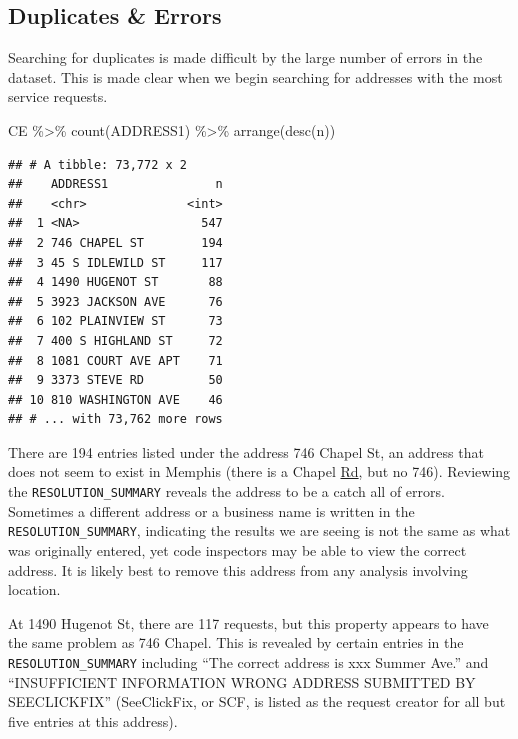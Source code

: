 \documentclass[
]{book}
\newenvironment{Shaded}{\begin{snugshade}}{\end{snugshade}}
\newcommand{\FunctionTok}[1]{\textcolor[rgb]{0.00,0.00,0.00}{#1}}
\newcommand{\NormalTok}[1]{#1}
\newcommand{\SpecialCharTok}[1]{\textcolor[rgb]{0.00,0.00,0.00}{#1}}
\begin{document}
\hypertarget{duplicates-errors}{%
\subsection{Duplicates \& Errors}\label{duplicates-errors}}

Searching for duplicates is made difficult by the large number of errors in the dataset. This is made clear when we begin searching for addresses with the most service requests.

\begin{Shaded}
\begin{Highlighting}[]
\NormalTok{CE }\SpecialCharTok{\%\textgreater{}\%} \FunctionTok{count}\NormalTok{(ADDRESS1) }\SpecialCharTok{\%\textgreater{}\%} \FunctionTok{arrange}\NormalTok{(}\FunctionTok{desc}\NormalTok{(n))}
\end{Highlighting}
\end{Shaded}

\begin{verbatim}
## # A tibble: 73,772 x 2
##    ADDRESS1               n
##    <chr>              <int>
##  1 <NA>                 547
##  2 746 CHAPEL ST        194
##  3 45 S IDLEWILD ST     117
##  4 1490 HUGENOT ST       88
##  5 3923 JACKSON AVE      76
##  6 102 PLAINVIEW ST      73
##  7 400 S HIGHLAND ST     72
##  8 1081 COURT AVE APT    71
##  9 3373 STEVE RD         50
## 10 810 WASHINGTON AVE    46
## # ... with 73,762 more rows
\end{verbatim}

There are 194 entries listed under the address 746 Chapel St, an address that does not seem to exist in Memphis (there is a Chapel \underline{Rd}, but no 746). Reviewing the \texttt{RESOLUTION\_SUMMARY} reveals the address to be a catch all of errors. Sometimes a different address or a business name is written in the \texttt{RESOLUTION\_SUMMARY}, indicating the results we are seeing is not the same as what was originally entered, yet code inspectors may be able to view the correct address. It is likely best to remove this address from any analysis involving location.

At 1490 Hugenot St, there are 117 requests, but this property appears to have the same problem as 746 Chapel. This is revealed by certain entries in the \texttt{RESOLUTION\_SUMMARY} including ``The correct address is xxx Summer Ave.'' and ``INSUFFICIENT INFORMATION WRONG ADDRESS SUBMITTED BY SEECLICKFIX'' (SeeClickFix, or SCF, is listed as the request creator for all but five entries at this address).
\end{document}
